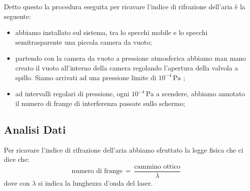 Detto questo la procedura eseguita per ricavare l'indice di rifrazione dell'aria è la seguente:
\begin{itemize}
	\item{abbiamo installato sul sistema, tra lo specchi mobile e lo specchi semitrasparente una piccola camera da vuoto;} %
	\item{partendo con la camera da vuoto a pressione atmosferica abbiamo man mano creato il vuoto all'interno della camera regolando l'apertura della valvola a spillo. Siamo arrivati ad una pressione limite di $10^{-4}\, \si{\pascal}$ ;}
	\item{ad intervalli regolari di pressione, ogni $10^{-4}\, \si{\pascal}$ a scendere, abbiamo annotato il numero di frange di interferenza passate sullo schermo;}
\end{itemize}

\subsection{Analisi Dati}

Per ricavare l'indice di rifrazione dell'aria abbiamo sfruttato la legge fisica che ci dice che:
\begin{equation}
	\text{numero di frange} \,=\, \frac{\text{cammino ottico}}{\lambda}
\end{equation}
dove con $\lambda$ si indica la lunghezza d'onda del laser.

  
